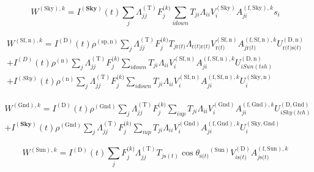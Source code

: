 \begin{equation}
{W^{{\mathrm{(Sky), }}k}} = {I^{({\mathbf{Sky}})}}(t)\sum\limits_j {\Lambda_{jj}^{{\mathrm{(T)}}}F_j^{{\mathrm{(}}k{\mathrm{)}}}\sum\limits_{i{\mathrm{ }}down} {{T_{ji}}{\Lambda_{ii}}V_i^{{\mathrm{(Sky)}}}A_{ji}^{{\mathrm{(f, Sky), }}k}{s_i}} }
\end{equation}

\begin{equation}
\begin{array}{c}{W^{{\mathrm{(Sf,n)}},k}} = {I^{{\mathrm{(D)}}}}(t){\rho ^{{\mathrm{(sp, n)}}}}\sum\limits_j {\Lambda_{jj}^{{\mathrm{(T)}}}F_j^{{\mathrm{(}}k{\mathrm{)}}}{T_{j{\mathrm{ r(}}t{\mathrm{)}}}}{\Lambda_{{\mathrm{ r(}}t{\mathrm{) r(}}t{\mathrm{)}}}}V_{{\mathrm{ r(}}t{\mathrm{)}}}^{{\mathrm{(Sf, n)}}}A_{j{\mathrm{ r(}}t{\mathrm{)}}}^{{\mathrm{(f, Sf, n), }}k}U_{{\mathrm{ r(}}t{\mathrm{) s(}}t{\mathrm{)}}}^{{\mathrm{(D,n)}}}} \\ + {I^{(D)}}(t){\rho ^{{\mathrm{(n)}}}}\sum\limits_j {\Lambda_{jj}^{{\mathrm{(T)}}}F_j^{{\mathrm{(}}k{\mathrm{)}}}\sum\limits_{i{\mathrm{ }}down} {{T_{ji}}{\Lambda_{ii}}V_i^{{\mathrm{(Sf, n)}}}A_{ji}^{{\mathrm{(f, Sf, n), }}k}U_{i{\mathrm{ }}Sun(tsh)}^{{\mathrm{(D,n)}}}} } \\ + {I^{(Sky)}}(t){\rho ^{{\mathrm{(n)}}}}\sum\limits_j {\Lambda_{jj}^{{\mathrm{(T)}}}F_j^{{\mathrm{(}}k{\mathrm{)}}}\sum\limits_{i{\mathrm{ }}down} {{T_{ji}}{\Lambda_{ii}}V_i^{{\mathrm{(Sf, n)}}}A_{ji}^{{\mathrm{(f, Sf, n), }}k}U_i^{{\mathrm{(Sky,n)}}}} } \end{array}
\end{equation}

\begin{equation}
\begin{array}{c}{W^{{\mathrm{(Gnd)}},k}} = {I^{{\mathrm{(D)}}}}(t){\rho ^{{\mathrm{(Gnd)}}}}\sum\limits_j {\Lambda_{jj}^{{\mathrm{(T)}}}F_j^{{\mathrm{(}}k{\mathrm{)}}}\sum\limits_{i{\mathrm{ }}up} {{T_{ji}}{\Lambda_{ii}}V_i^{{\mathrm{(Gnd)}}}A_{ji}^{{\mathrm{(f, Gnd), }}k}U_{i{\mathrm{ }}Sky(tch)}^{{\mathrm{(D, Gnd)}}}} } \\ + {I^{({\mathbf{Sky}})}}(t){\rho ^{{\mathrm{(Gnd)}}}}\sum\limits_j {\Lambda_{jj}^{{\mathrm{(T)}}}F_j^{{\mathrm{(}}k{\mathrm{)}}}\sum\limits_{i{\mathrm{ }}up} {{T_{ji}}{\Lambda_{ii}}V_i^{{\mathrm{(Gnd)}}}A_{ji}^{{\mathrm{(f, Gnd), }}k}U_i^{{\mathrm{( Sky,Gnd)}}}} } \end{array}
\end{equation}

\begin{equation}
{W^{{\mathrm{(Sun)}},k}} = {I^{{\mathrm{(D)}}}}(t)\sum\limits_j {F_j^{{\mathrm{(}}k{\mathrm{)}}}\Lambda_{jj}^{{\mathrm{(T)}}}{T_{j{\mathrm{ s}}(t)}}\cos {\theta_{{\mathrm{s(}}t{\mathrm{)}}}}^{{\mathrm{(Sun)}}}V_{i{\mathrm{ s(}}t{\mathrm{)}}}^{{\mathrm{(D)}}}A_{j{\mathrm{ s(}}t{\mathrm{)}}}^{{\mathrm{(f, Sun), }}k}}
\end{equation}

